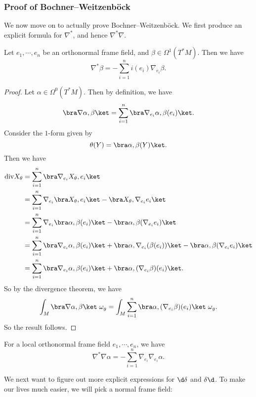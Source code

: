 \documentclass[a4paper]{article}
\renewcommand\div{\mathrm{div}}
\begin{document}
\subsubsection*{Proof of Bochner--Weitzenb\"ock}
We now move on to actually prove Bochner--Weitzenb\"ock. We first produce an explicit formula for $\nabla^*$, and hence $\nabla^* \nabla$.

\begin{prop}
  Let $e_1, \cdots, e_n$ be an orthonormal frame field, and $\beta \in \Omega^1(T^*M)$. Then we have
  \[
    \nabla^* \beta = - \sum_{i = 1}^n i(e_i) \nabla_{e_i}\beta.
  \]
\end{prop}

\begin{proof}
  Let $\alpha \in \Omega^0(T^*M)$. Then by definition, we have
  \[
    \bra \nabla \alpha, \beta\ket = \sum_{i = 1}^n \bra \nabla_{e_i} \alpha, \beta(e_i)\ket.
  \]
  Consider the $1$-form given by
  \[
    \theta(Y) = \bra \alpha, \beta(Y)\ket.
  \]
  Then we have
  \begin{align*}
    \div X_\theta &= \sum_{i = 1}^n \bra \nabla_{e_i} X_\theta, e_i \ket\\
    &= \sum_{i = 1}^n \nabla_{e_i}\bra X_\theta, e_i\ket - \bra X_\theta, \nabla_{e_i}e_i\ket\\
    &= \sum_{i = 1}^n \nabla_{e_i} \bra \alpha, \beta(e_i)\ket - \bra \alpha, \beta(\nabla_{e_i} e_i)\ket\\
    &= \sum_{i = 1}^n \bra \nabla_{e_i} \alpha, \beta(e_i)\ket + \bra \alpha, \nabla_{e_i}(\beta(e_i))\ket - \bra \alpha, \beta(\nabla_{e_i} e_i)\ket\\
    &= \sum_{i = 1}^n \bra \nabla_{e_i} \alpha, \beta(e_i)\ket + \bra \alpha, (\nabla_{e_i} \beta) (e_i)\ket.
  \end{align*}
  So by the divergence theorem, we have
  \[
    \int_M \bra \nabla \alpha, \beta\ket\; \omega_g = \int_M \sum_{i = 1}^n \bra \alpha, (\nabla_{e_i}\beta)(e_i)\ket\; \omega_g.
  \]
  So the result follows.
\end{proof}

\begin{cor}
  For a local orthonormal frame field $e_1, \cdots, e_n$, we have
  \[
    \nabla^* \nabla \alpha = -\sum_{i = 1}^n \nabla_{e_i} \nabla_{e_i} \alpha.
  \]
\end{cor}

We next want to figure out more explicit expressions for $\d \delta$ and $\delta \d$. To make our lives much easier, we will pick a normal frame field:
\end{document}
